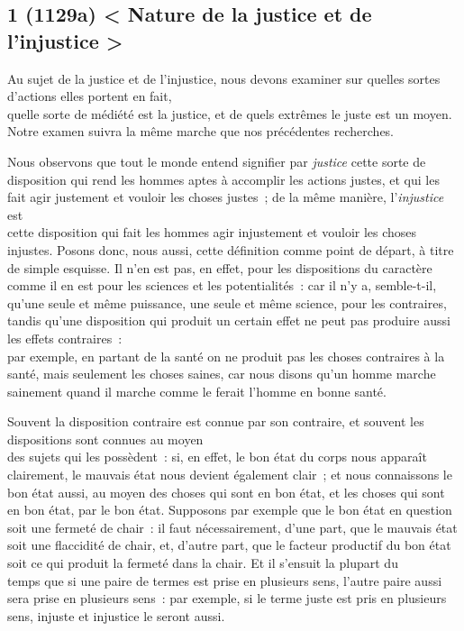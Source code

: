 \documentclass[french,twoside]{book} %
\begin{document}
\subsection[{1 (1129a) < Nature de la justice et de l’injustice >}]{1 (1129a) < Nature de la justice et de l’injustice >}
\noindent  Au sujet de la justice et de l’injustice, nous devons examiner sur quelles sortes d’actions elles portent en fait, \\
quelle sorte de médiété est la justice, et de quels extrêmes le juste est un moyen. Notre examen suivra la même marche que nos précédentes recherches.\par
Nous observons que tout le monde entend signifier par {\itshape justice} cette sorte de disposition qui rend les hommes aptes à accomplir les actions justes, et qui les fait agir justement et vouloir les choses justes ; de la même manière, l’{\itshape injustice} est \\
cette disposition qui fait les hommes agir injustement et vouloir les choses injustes. Posons donc, nous aussi, cette définition comme point de départ, à titre de simple esquisse. Il n’en est pas, en effet, pour les dispositions du caractère comme il en est pour les sciences et les potentialités : car il n’y a, semble-t-il, qu’une seule et même puissance, une seule et même science, pour les contraires, tandis qu’une disposition qui produit un certain effet ne peut pas produire aussi les effets contraires : \\
par exemple, en partant de la santé on ne produit pas les choses contraires à la santé, mais seulement les choses saines, car nous disons qu’un homme marche sainement quand il marche comme le ferait l’homme en bonne santé.\par
Souvent la disposition contraire est connue par son contraire, et souvent les dispositions sont connues au moyen \\
des sujets qui les possèdent : si, en effet, le bon état du corps nous apparaît clairement, le mauvais état nous devient également clair ; et nous connaissons le bon état aussi, au moyen des choses qui sont en bon état, et les choses qui sont en bon état, par le bon état. Supposons par exemple que le bon état en question soit une fermeté de chair : il faut nécessairement, d’une part, que le mauvais état soit une flaccidité de chair, et, d’autre part, que le facteur productif du bon état soit ce qui produit la fermeté dans la chair. Et il s’ensuit la plupart du \\
temps que si une paire de termes est prise en plusieurs sens, l’autre paire aussi sera prise en plusieurs sens : par exemple, si le terme juste est pris en plusieurs sens, injuste et injustice le seront aussi.
\end{document}
